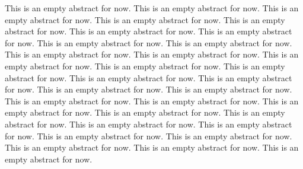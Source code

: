 This is an empty abstract for now. This is an empty abstract for now. This is an empty abstract for now. This is an empty abstract for now. This is an empty abstract for now. This is an empty abstract for now. This is an empty abstract for now. This is an empty abstract for now. This is an empty abstract for now. This is an empty abstract for now. This is an empty abstract for now. This is an empty abstract for now. This is an empty abstract for now. This is an empty abstract for now. This is an empty abstract for now. This is an empty abstract for now. This is an empty abstract for now. This is an empty abstract for now. This is an empty abstract for now. This is an empty abstract for now. This is an empty abstract for now. This is an empty abstract for now. This is an empty abstract for now. This is an empty abstract for now. This is an empty abstract for now. This is an empty abstract for now. This is an empty abstract for now. This is an empty abstract for now. This is an empty abstract for now. This is an empty abstract for now.